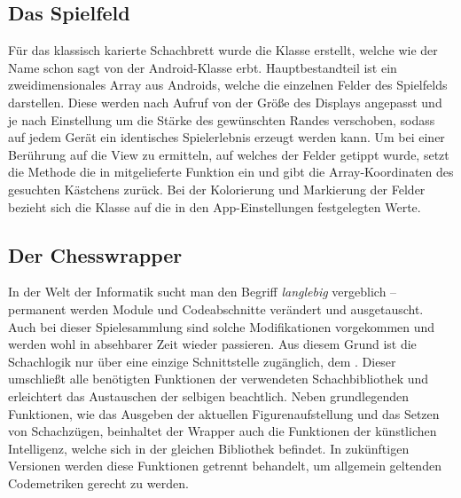 \subsection{Das Spielfeld}

Für das klassisch karierte Schachbrett wurde die Klasse
 erstellt, welche wie der Name schon sagt von der
Android-Klasse  erbt. Hauptbestandteil ist ein zweidimensionales
Array aus Androids, welche die einzelnen Felder des Spielfelds
darstellen. Diese werden nach Aufruf von  der Größe des
Displays angepasst und je nach Einstellung um die Stärke des gewünschten Randes
verschoben, sodass auf jedem Gerät ein identisches Spielerlebnis erzeugt werden
kann. Um bei einer Berührung auf die View zu ermitteln, auf welches der Felder
getippt wurde, setzt die Methode  die in
 mitgelieferte Funktion  ein und gibt
die Array-Koordinaten des gesuchten Kästchens zurück. Bei der Kolorierung und
Markierung der Felder bezieht sich die Klasse auf die in den App-Einstellungen
festgelegten Werte.

\subsection{Der Chesswrapper}

In der Welt der Informatik sucht man den Begriff \emph{langlebig} vergeblich --
permanent werden Module und Codeabschnitte verändert und ausgetauscht. Auch bei
dieser Spielesammlung sind solche Modifikationen vorgekommen und werden wohl in
absehbarer Zeit wieder passieren. Aus diesem Grund ist die Schachlogik nur über
eine einzige Schnittstelle zugänglich, dem . Dieser
umschließt alle benötigten Funktionen der verwendeten Schachbibliothek und
erleichtert das Austauschen der selbigen beachtlich. Neben grundlegenden
Funktionen, wie das Ausgeben der aktuellen Figurenaufstellung und das Setzen
von Schachzügen, beinhaltet der Wrapper auch die Funktionen der künstlichen
Intelligenz, welche sich in der gleichen Bibliothek befindet. In zukünftigen
Versionen werden diese Funktionen getrennt behandelt, um allgemein geltenden
Codemetriken gerecht zu werden. 

